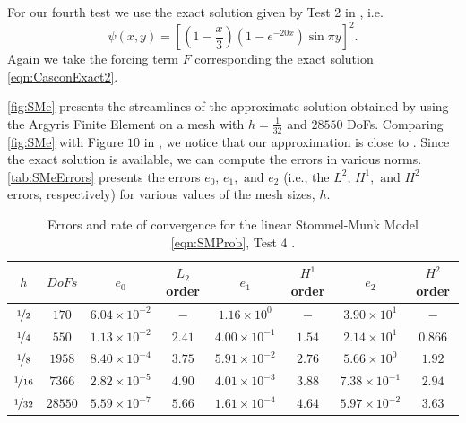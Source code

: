 For our fourth test we use the exact solution given by Test 2 in \cite{Cascon},
i.e.
{\small
\begin{equation}
  \psi(x,y) = \left[\left(1 - \frac{x}{3}\right)\left(1-e^{-20x}\right) \sin \pi y\right]^2.
  \label{eqn:CasconExact2}
\end{equation}
}
Again we take the forcing term $F$ corresponding the exact solution
\eqref{eqn:CasconExact2}.

\autoref{fig:SMe} presents the streamlines of the approximate solution obtained
by using the Argyris Finite Element on a mesh with $h=\frac{1}{32}$ and $28550$
DoFs. Comparing \autoref{fig:SMe} with Figure $10$ in \cite{Myers}, we notice
that our approximation is close to \cite{Myers}. Since the exact solution is
available, we can compute the errors in various norms. \autoref{tab:SMeErrors}
presents the errors $e_0,\, e_1, \text{ and } e_2$ (i.e., the $L^2,\, H^1,
\text{ and } H^2$ errors, respectively) for various values of the mesh sizes,
$h$.

\begin{table}%
\begin{center}
\begin{tabular}{|c|c|c|c|c|c|c|c|}%
  \hline
  $h$ & $DoFs$ & $e_0$ & $L_2$ order & $e_1$ & $H^1$ order & $e_2$ & $H^2$ order \\[0.2em] %
  \hline
  $\nicefrac{1}{2}$ & $170$ & $6.04\times 10^{-2}$ & $-$ & $1.16\times 10^0$ & $-$ & $3.90\times 10^1$ & $-$ \\[0.2em] %
  $\nicefrac{1}{4}$ & $550$ & $1.13\times 10^{-2}$ & $2.41$ & $4.00\times 10^{-1}$ & $1.54$ & $2.14\times 10^1$ & $0.866$ \\[0.2em] %
  $\nicefrac{1}{8}$ & $1958$ & $8.40\times 10^{-4}$ & $3.75$ & $5.91\times 10^{-2}$ & $2.76$ & $5.66\times 10^0$ & $1.92$ \\[0.2em] %
  $\nicefrac{1}{16}$ & $7366$ & $2.82\times 10^{-5}$ & $4.90$ & $4.01\times 10^{-3}$ & $3.88$ & $7.38\times 10^{-1}$ & $2.94$ \\[0.2em] %
  $\nicefrac{1}{32}$ & $28550$ & $5.59\times 10^{-7}$ & $5.66$ & $1.61\times 10^{-4}$ & $4.64$ & $5.97\times 10^{-2}$ & $3.63$ \\[0.2em] %
 \hline
\end{tabular}
\end{center}
\caption{Errors and rate of convergence for the linear Stommel-Munk Model
  \eqref{eqn:SMProb}, Test 4 \cite{Cascon}.}
\label{tab:SMeErrors}
\end{table}

